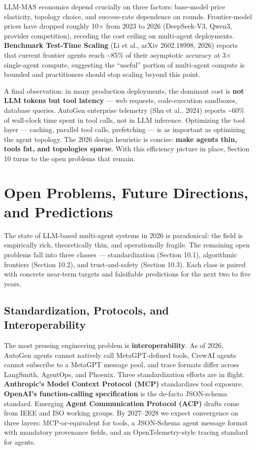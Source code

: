 LLM-MAS economics depend crucially on three factors: base-model price elasticity, topology choice, and success-rate dependence on rounds. Frontier-model prices have dropped roughly 10× from 2023 to 2026 (DeepSeek-V3, Qwen3, provider competition), receding the cost ceiling on multi-agent deployments. \textbf{Benchmark Test-Time Scaling} (Li et al., arXiv 2602.18998, 2026) reports that current frontier agents reach \textasciitilde85\% of their asymptotic accuracy at 3× single-agent compute, suggesting the ``useful'' portion of multi-agent compute is bounded and practitioners should stop scaling beyond this point.

A final observation: in many production deployments, the dominant cost is \textbf{not LLM tokens but tool latency} --- web requests, code-execution sandboxes, database queries. AutoGen enterprise telemetry (Shu et al., 2024) reports \textasciitilde60\% of wall-clock time spent in tool calls, not in LLM inference. Optimizing the tool layer --- caching, parallel tool calls, prefetching --- is as important as optimizing the agent topology. The 2026 design heuristic is concise: \textbf{make agents thin, tools fat, and topologies sparse}. With this efficiency picture in place, Section 10 turns to the open problems that remain.

\section{Open Problems, Future Directions, and Predictions}\label{open-problems-future-directions-and-predictions}

The state of LLM-based multi-agent systems in 2026 is paradoxical: the field is empirically rich, theoretically thin, and operationally fragile. The remaining open problems fall into three classes --- standardization (Section 10.1), algorithmic frontiers (Section 10.2), and trust-and-safety (Section 10.3). Each class is paired with concrete near-term targets and falsifiable predictions for the next two to five years.

\subsection{Standardization, Protocols, and Interoperability}\label{standardization-protocols-and-interoperability}

The most pressing engineering problem is \textbf{interoperability}. As of 2026, AutoGen agents cannot natively call MetaGPT-defined tools, CrewAI agents cannot subscribe to a MetaGPT message pool, and trace formats differ across LangSmith, AgentOps, and Phoenix. Three standardization efforts are in flight. \textbf{Anthropic's Model Context Protocol (MCP)} standardizes tool exposure. \textbf{OpenAI's function-calling specification} is the de-facto JSON-schema standard. Emerging \textbf{Agent Communication Protocol (ACP)} drafts come from IEEE and ISO working groups. By 2027--2028 we expect convergence on three layers: MCP-or-equivalent for tools, a JSON-Schema agent message format with mandatory provenance fields, and an OpenTelemetry-style tracing standard for agents.

